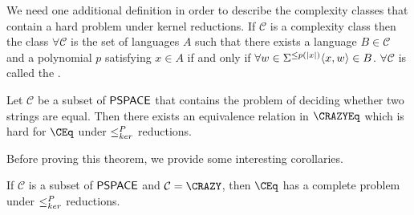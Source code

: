 We need one additional definition in order to describe the complexity classes that contain a hard problem under kernel reductions.
If $\mathcal{C}$ is a complexity class then the class $\forall\mathcal{C}$ is the set of languages $A$ such that there exists a language $B\in\mathcal{C}$ and a polynomial $p$ satisfying $x\in A$ if and only if $\forall w\in\Sigma^{\leq p(|x|)} \langle x,w\rangle\in B$.
$\forall\mathcal{C}$ is called the .

\begin{theorem}\label{thm:generalcompleteness}
  Let $\mathcal{C}$ be a subset of ${\mathsf{PSPACE}}$ that contains the problem of deciding whether two strings are equal.
  Then there exists an equivalence relation in $\CRAZYEq$ which is hard for $\CEq$ under $\leq^{P}_{ker}$ reductions.
\end{theorem}

Before proving this theorem, we provide some interesting corollaries.

\begin{corollary}\label{cor:sufficient}
  If $\mathcal{C}$ is a subset of ${\mathsf{PSPACE}}$ and $\mathcal{C}=\CRAZY$, then $\CEq$ has a complete problem under $\leq^{P}_{ker}$ reductions.
\end{corollary}


